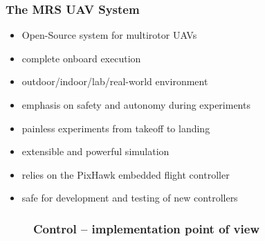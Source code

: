 \documentclass[aspectratio=1610]{beamer}
\begin{document}
  \begin{frame}
    \frametitle{The MRS UAV System}

    \begin{itemize}
      \item Open-Source system for multirotor UAVs
      \item complete onboard execution
      \item outdoor/indoor/lab/real-world environment
      \item emphasis on safety and autonomy during experiments
      \item painless experiments from takeoff to landing
      \item extensible and powerful simulation
      \item relies on the PixHawk embedded flight controller
      \item safe for development and testing of new controllers
    \end{itemize}

  \end{frame}


  \begin{frame}
    \centering
    \begin{figure}

      \frametitle{Control -- implementation point of view}

      \begin{adjustbox}{max totalsize={1.0\textwidth}{.90\textheight}, center}
        
      \end{adjustbox}

    \end{figure}

  \end{frame}


\end{document}
